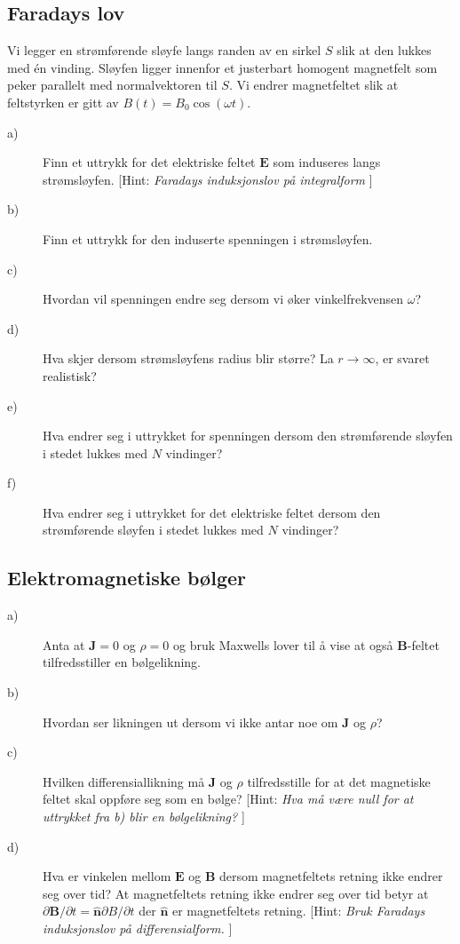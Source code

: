 \documentclass[twoside,utf8]{article}
\begin{document}
\subsection{Faradays lov}
Vi legger en strømførende sløyfe langs randen av en sirkel $S$ slik at den lukkes med én vinding.
Sløyfen ligger innenfor et justerbart homogent magnetfelt som peker parallelt med normalvektoren til $S$.
Vi endrer magnetfeltet slik at feltstyrken er gitt av $B(t)=B_0 \cos (\omega t)$.
\begin{description}
	\item[a)] Finn et uttrykk for det elektriske feltet $\mathbf{E}$ som induseres langs strømsløyfen.
		[Hint: {\it Faradays induksjonslov på integralform }]
	\item[b)] Finn et uttrykk for den induserte spenningen i strømsløyfen.
	\item[c)] Hvordan vil spenningen endre seg dersom vi øker vinkelfrekvensen $\omega$?
	\item[d)] Hva skjer dersom strømsløyfens radius blir større? La $r\rightarrow \infty$, er svaret realistisk?
	\item[e)] Hva endrer seg i uttrykket for spenningen dersom den strømførende sløyfen i stedet lukkes med $N$ vindinger?
	\item[f)] Hva endrer seg i uttrykket for det elektriske feltet dersom den strømførende sløyfen i stedet lukkes med $N$ vindinger?
\end{description}




\subsection{Elektromagnetiske bølger}
\begin{description}
	\item[a)] Anta at $\mathbf{J}=0$ og $\rho=0$ og bruk Maxwells lover til å vise at også $\mathbf{B}$-feltet tilfredsstiller en bølgelikning.
	\item[b)] Hvordan ser likningen ut dersom vi ikke antar noe om $\mathbf{J}$ og $\rho$?
	\item[c)] Hvilken differensiallikning må $\mathbf{J}$ og $\rho$ tilfredsstille for at det magnetiske feltet skal oppføre seg som en bølge?
		[Hint: {\it Hva må være null for at uttrykket fra b) blir en bølgelikning? }]
	\item[d)] Hva er vinkelen mellom $\mathbf{E}$ og $\mathbf{B}$ dersom magnetfeltets retning ikke endrer seg over tid? At magnetfeltets retning ikke endrer seg over tid betyr at $\partial \mathbf{B}/\partial t = \hat{\mathbf{n}} \partial B/\partial t$ der $\hat{\mathbf{n}}$ er magnetfeltets retning.
		[Hint: {\it Bruk Faradays induksjonslov på differensialform. }]
\end{description}
\end{document}
